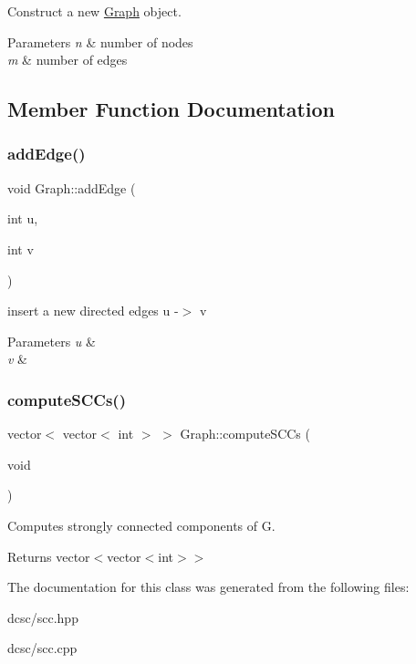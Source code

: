 Construct a new \mbox{\hyperlink{classGraph}{Graph}} object. 


\begin{DoxyParams}{Parameters}
{\em n} & number of nodes \\
\hline
{\em m} & number of edges \\
\hline
\end{DoxyParams}


\subsection{Member Function Documentation}
\mbox{\label{classGraph_ad8c10df34357b2cd865c81e0c4f0bd8c}} 
\subsubsection{\texorpdfstring{add\+Edge()}{addEdge()}}
{\footnotesize\ttfamily void Graph\+::add\+Edge (\begin{DoxyParamCaption}\item[{int}]{u,  }\item[{int}]{v }\end{DoxyParamCaption})}



insert a new directed edges u -\/$>$ v 


\begin{DoxyParams}{Parameters}
{\em u} & \\
\hline
{\em v} & \\
\hline
\end{DoxyParams}
\mbox{\label{classGraph_a35fd495e6f86b5323d15e2ed1cc4b692}} 
\subsubsection{\texorpdfstring{compute\+S\+C\+Cs()}{computeSCCs()}}
{\footnotesize\ttfamily vector$<$ vector$<$ int $>$ $>$ Graph\+::compute\+S\+C\+Cs (\begin{DoxyParamCaption}\item[{void}]{ }\end{DoxyParamCaption})}



Computes strongly connected components of G. 

\begin{DoxyReturn}{Returns}
vector$<$vector$<$int$>$$>$ 
\end{DoxyReturn}


The documentation for this class was generated from the following files\+:\begin{DoxyCompactItemize}
\item 
dcsc/scc.\+hpp\item 
dcsc/scc.\+cpp\end{DoxyCompactItemize}
